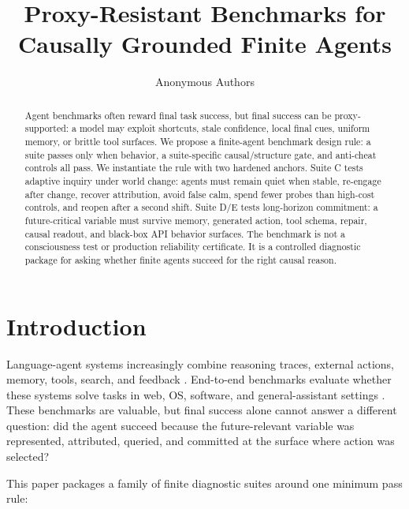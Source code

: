 \documentclass[10pt,twocolumn]{article}
\title{Proxy-Resistant Benchmarks for Causally Grounded Finite Agents}
\author{Anonymous Authors}
\date{}
\begin{document}
\maketitle

\begin{abstract}
Agent benchmarks often reward final task success, but final success can be
proxy-supported: a model may exploit shortcuts, stale confidence, local final
cues, uniform memory, or brittle tool surfaces. We propose a finite-agent
benchmark design rule: a suite passes only when behavior, a suite-specific
causal/structure gate, and anti-cheat controls all pass. We instantiate the rule
with two hardened anchors. Suite C tests adaptive inquiry under world change:
agents must remain quiet when stable, re-engage after change, recover
attribution, avoid false calm, spend fewer probes than high-cost controls, and
reopen after a second shift. Suite D/E tests long-horizon commitment: a
future-critical variable must survive memory, generated action, tool schema,
repair, causal readout, and black-box API behavior surfaces. The benchmark is
not a consciousness test or production reliability certificate. It is a
controlled diagnostic package for asking whether finite agents succeed for the
right causal reason.
\end{abstract}

\section{Introduction}

Language-agent systems increasingly combine reasoning traces, external actions,
memory, tools, search, and feedback \citep{yao2022react, shinn2023reflexion,
wang2023voyager, ahn2022saycan, yao2023tree}. End-to-end benchmarks evaluate
whether these systems solve tasks in web, OS, software, and general-assistant
settings \citep{liu2023agentbench, zhou2023webarena, xie2024osworld,
mialon2023gaia, jimenez2024swebench}. These benchmarks are valuable, but final
success alone cannot answer a different question: did the agent succeed because
the future-relevant variable was represented, attributed, queried, and committed
at the surface where action was selected?

This paper packages a family of finite diagnostic suites around one minimum pass
rule:
\begin{center}
\end{center}
\end{document}

